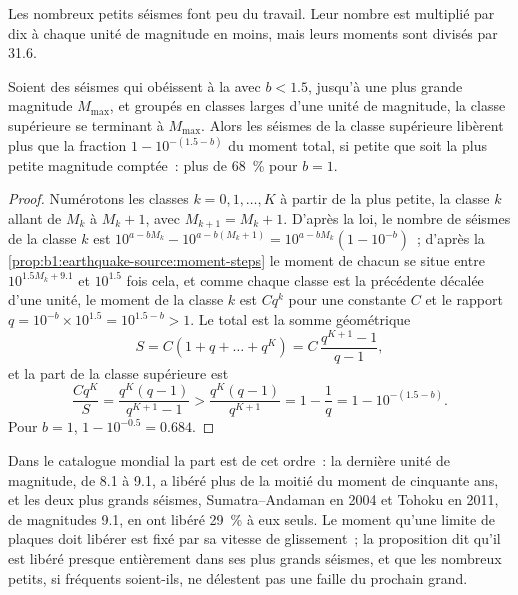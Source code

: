 Les nombreux petits séismes font peu du travail. Leur nombre est multiplié par dix
à chaque unité de magnitude en moins, mais leurs moments sont divisés par 31.6.

\begin{proposition}\label{prop:b1:earthquake-source:largest}
Soient des séismes qui obéissent à la  avec $b < 1.5$, jusqu'à une
plus grande magnitude $M_{\max}$, et groupés en classes larges d'une unité de
magnitude, la classe supérieure se terminant à $M_{\max}$. Alors les séismes de la classe
supérieure libèrent plus que la fraction $1 - 10^{-(1.5 - b)}$ du moment total,
si petite que soit la plus petite magnitude comptée~: plus de \qty{68}{\percent} pour
$b = 1$.
\end{proposition}

\begin{proof}
Numérotons les classes $k = 0, 1, \dots, K$ à partir de la plus petite, la classe $k$
allant de $M_k$ à $M_k + 1$, avec $M_{k+1} = M_k + 1$. D'après la loi, le nombre
de séismes de la classe $k$ est $10^{a - bM_k} - 10^{a - b(M_k+1)} =
10^{a - bM_k}(1 - 10^{-b})$~; d'après la \cref{prop:b1:earthquake-source:moment-steps}
le moment de chacun se situe entre $10^{1.5M_k + 9.1}$ et $10^{1.5}$ fois cela,
et comme chaque classe est la précédente décalée d'une unité, le moment de
la classe $k$ est $C q^k$ pour une constante $C$ et le rapport
$q = 10^{-b}\times10^{1.5} = 10^{1.5 - b} > 1$. Le total est la somme géométrique
\[
  S = C(1 + q + \dots + q^K) = C\,\frac{q^{K+1} - 1}{q - 1} ,
\]
et la part de la classe supérieure est
\[
  \frac{C q^K}{S} = \frac{q^K (q - 1)}{q^{K+1} - 1}
  > \frac{q^K (q - 1)}{q^{K+1}} = 1 - \frac1q = 1 - 10^{-(1.5 - b)} .
\]
Pour $b = 1$, $1 - 10^{-0.5} = 0.684$.
\end{proof}

Dans le catalogue mondial la part est de cet ordre~: la dernière unité de magnitude,
de 8.1 à 9.1, a libéré plus de la moitié du moment de cinquante ans, et les deux
plus grands séismes, Sumatra--Andaman en 2004 et Tohoku en 2011, de
magnitudes 9.1, en ont libéré \qty{29}{\percent} à eux seuls. Le moment qu'une
limite de plaques doit libérer est fixé par sa vitesse de glissement~; la proposition dit
qu'il est libéré presque entièrement dans ses plus grands séismes, et que les nombreux
petits, si fréquents soient-ils, ne délestent pas une faille du prochain grand.

